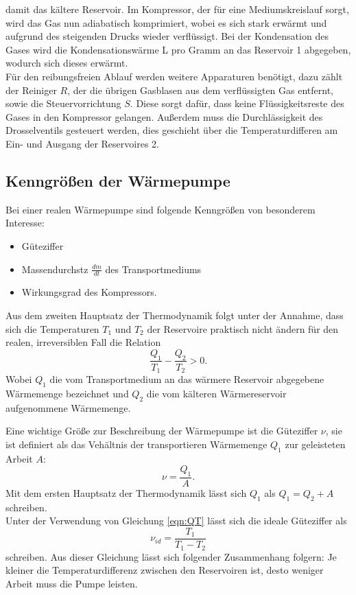 damit das kältere Reservoir. Im Kompressor, der für eine Mediumskreislauf sorgt, wird das Gas nun
adiabatisch komprimiert, wobei es sich stark erwärmt und aufgrund des steigenden Drucks wieder verflüssigt.
Bei der Kondensation des Gases wird die Kondensationswärme L pro Gramm an das Reservoir 1 abgegeben, wodurch sich
dieses erwärmt.\\
Für den reibungsfreien Ablauf werden weitere Apparaturen benötigt, dazu zählt der Reiniger $R$, der
die übrigen Gasblasen aus dem verflüssigten Gas entfernt, sowie die Steuervorrichtung $S$.
Diese sorgt dafür, dass keine Flüssigkeitsreste des Gases in den Kompressor gelangen.
Außerdem muss die Durchlässigkeit des Drosselventils gesteuert werden, dies geschieht über
die Temperaturdifferen am Ein- und Ausgang der Reservoires 2.

\subsection{Kenngrößen der Wärmepumpe}
Bei einer realen Wärmepumpe sind folgende Kenngrößen von besonderem Interesse:
\begin{itemize}
  \item Güteziffer
  \item Massendurchstz $\frac{dm}{dt}$ des Transportmediums
  \item Wirkungsgrad des Kompressors.
\end{itemize}

Aus dem zweiten Hauptsatz der Thermodynamik folgt unter der Annahme, dass sich die Temperaturen
$T_{1}$ und $T_{2}$ der Reservoire praktisch nicht ändern für den realen, irreversiblen Fall die Relation
\begin{equation}
  \frac{Q_{1}}{T_{1}}-\frac{Q_{2}}{T_{2}}>0.
  \label{eqn:QT}
\end{equation}
Wobei $Q_{1}$ die vom Transportmedium an das wärmere Reservoir abgegebene Wärmemenge bezeichnet und
$Q_{2}$ die vom kälteren Wärmereservoir aufgenommene Wärmemenge.

Eine wichtige Größe zur Beschreibung der Wärmepumpe ist die Güteziffer $\nu$, sie ist definiert
als das Vehältnis der transportieren Wärmemenge $Q_{1}$ zur geleisteten Arbeit $A$:
\begin{equation}
  \nu=\frac{Q_{1}}{A}.
  \label{eqn:güte}
\end{equation}
Mit dem ersten Hauptsatz der Thermodynamik lässt sich $Q_{1}$ als $Q_{1}=Q_{2}+A$ schreiben.\\
Unter der Verwendung von Gleichung \ref{eqn:QT} lässt sich die ideale Güteziffer als
\begin{equation}
  \nu_{id}=\frac{T_{1}}{T_{1}-T_{2}}
  \label{eqn:güte2}
\end{equation}
schreiben. Aus dieser Gleichung lässt sich folgender Zusammenhang folgern:
Je kleiner die Temperaturdifferenz zwischen den Reservoiren ist, desto weniger Arbeit muss
die Pumpe leisten.

